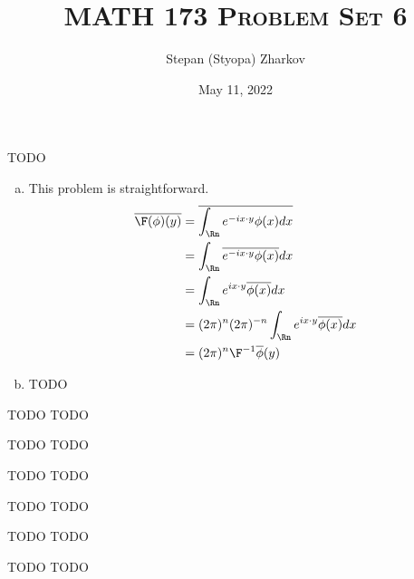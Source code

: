 \documentclass{article}
\title{\textsc{MATH 173 Problem Set 6}}
\author{Stepan (Styopa) Zharkov}
\date{May 11, 2022}
\begin{document}
\maketitle
{} TODO
 \tri
\hop 
\solution
\begin{enumerate}[(a)]
    \item This problem is straightforward. 
    \begin{align*}
        \ol{\F(\phi)(y)} &= \ol {\int_\Rn e^{-ix \cdot y}\phi(x)dx} \\
        &= \int_\Rn \ol {e^{-ix \cdot y}\phi(x)}dx \\
        &= \int_\Rn e^{ix \cdot y}\ol{\phi(x)}dx \\
        &= (2\pi)^n(2\pi)^{-n}\int_\Rn e^{ix \cdot y}\ol{\phi(x)}dx \\
        &= (2\pi)^n\F\inv\ol{\phi}(y) \\
    \end{align*}

    \item TODO
\end{enumerate}



\newpage
{} TODO
 \tri
\hop 
\solution
TODO 


\newpage
{} TODO
 \tri
\hop 
\solution
TODO 


\newpage
{} TODO
 \tri
\hop 
\solution
TODO 


\newpage
{} TODO
 \tri
\hop 
\solution
TODO 


\newpage
{} TODO
 \tri
\hop 
\solution
TODO 


\newpage
{} TODO
 \tri
\hop 
\solution
TODO 
\end{document}
